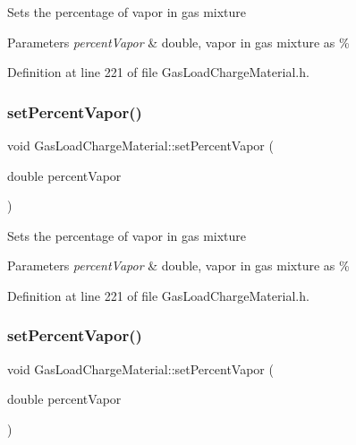 Sets the percentage of vapor in gas mixture 
\begin{DoxyParams}{Parameters}
{\em percent\+Vapor} & double, vapor in gas mixture as \% \\
\hline
\end{DoxyParams}


Definition at line 221 of file Gas\+Load\+Charge\+Material.\+h.

\mbox{\label{class_gas_load_charge_material_acace81e16ef531acb0a68462ab0ed25d}} 
\subsubsection{\texorpdfstring{set\+Percent\+Vapor()}{setPercentVapor()}\hspace{0.1cm}{\footnotesize\ttfamily [2/3]}}
{\footnotesize\ttfamily void Gas\+Load\+Charge\+Material\+::set\+Percent\+Vapor (\begin{DoxyParamCaption}\item[{double}]{percent\+Vapor }\end{DoxyParamCaption})\hspace{0.3cm}{\ttfamily [inline]}}

Sets the percentage of vapor in gas mixture 
\begin{DoxyParams}{Parameters}
{\em percent\+Vapor} & double, vapor in gas mixture as \% \\
\hline
\end{DoxyParams}


Definition at line 221 of file Gas\+Load\+Charge\+Material.\+h.

\mbox{\label{class_gas_load_charge_material_acace81e16ef531acb0a68462ab0ed25d}} 
\subsubsection{\texorpdfstring{set\+Percent\+Vapor()}{setPercentVapor()}\hspace{0.1cm}{\footnotesize\ttfamily [3/3]}}
{\footnotesize\ttfamily void Gas\+Load\+Charge\+Material\+::set\+Percent\+Vapor (\begin{DoxyParamCaption}\item[{double}]{percent\+Vapor }\end{DoxyParamCaption})\hspace{0.3cm}{\ttfamily [inline]}}

